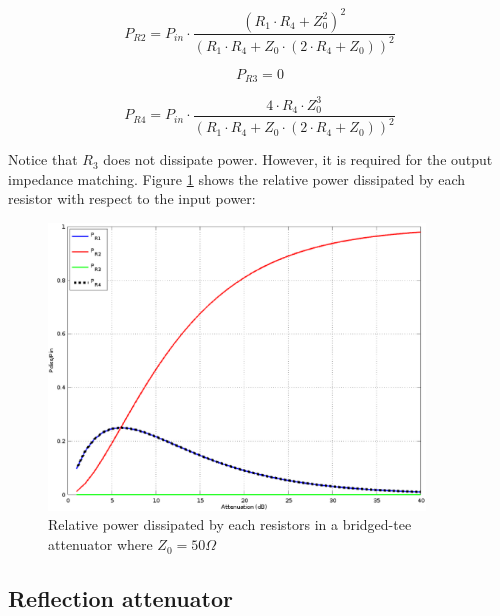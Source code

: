 \begin{equation}
P_{R2} = P_{in} \cdot \dfrac{(R_1 \cdot R_4 + Z_0^2)^2 }{ (R_1 \cdot R_4 + Z_0 \cdot (2 \cdot R_4 + Z_0))^2}
\end{equation}

\begin{equation}
P_{R3} = 0
\end{equation}

\begin{equation}
P_{R4} = P_{in} \cdot \dfrac{4\cdot R_4\cdot Z_0^3}{ (R_1 \cdot R_4 + Z_0 \cdot (2 \cdot R_4 + Z_0))^2}
\end{equation}

\noindent Notice that $R_3$ does not dissipate power. However, it is required for the output impedance matching. Figure \ref{fig:bridged-tee_pow_diss_Z0_50} shows the relative power dissipated by each resistor with respect to the input power:

\begin{figure}[ht]
\begin{center}
\includegraphics[width=10cm]{bitmaps/synthesis/attenuators/Relative-dissipated-power-bridged-tee-50}
\end{center}
\caption{Relative power dissipated by each resistors in a bridged-tee attenuator where $Z_{0} = 50\Omega$}
\label{fig:bridged-tee_pow_diss_Z0_50}
\end{figure}
\FloatBarrier

\clearpage
\subsection{Reflection attenuator}
